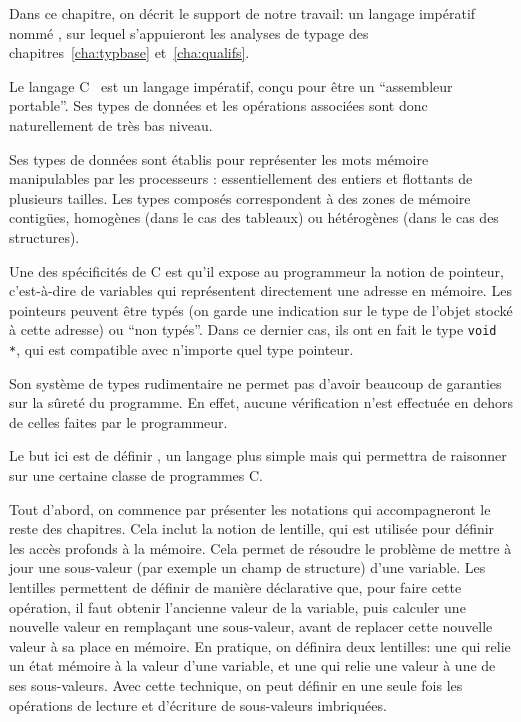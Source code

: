 Dans ce chapitre, on décrit le support de notre travail: un langage impératif
nommé \langname, sur lequel s'appuieront les analyses de typage des
chapitres~\ref{cha:typbase} et~\ref{cha:qualifs}.

Le langage C~\cite{KandR} est un langage impératif, conçu pour être un
\enquote{assembleur portable}. Ses types de données et les opérations associées
sont donc naturellement de très bas niveau.

Ses types de données sont établis pour représenter les mots mémoire manipulables
par les processeurs : essentiellement des entiers et flottants de plusieurs
tailles. Les types composés correspondent à des zones de mémoire contigües,
homogènes (dans le cas des tableaux) ou hétérogènes (dans le cas des
structures).

Une des spécificités de C est qu'il expose au programmeur la notion de pointeur,
c'est-à-dire de variables qui représentent directement une adresse en mémoire.
Les pointeurs peuvent être typés (on garde une indication sur le type de l'objet
stocké à cette adresse) ou \enquote{non typés}. Dans ce dernier cas, ils ont en
fait le type \texttt{void *}, qui est compatible avec n'importe quel type
pointeur.


Son système de types rudimentaire ne permet pas d'avoir beaucoup de garanties
sur la sûreté du programme. En effet, aucune vérification n'est effectuée en
dehors de celles faites par le programmeur.

Le but ici est de définir \langname, un langage plus simple mais qui permettra
de raisonner sur une certaine classe de programmes C.

Tout d'abord, on commence par présenter les notations qui accompagneront le
reste des chapitres. Cela inclut la notion de lentille, qui est utilisée pour
définir les accès profonds à la mémoire. Cela permet de résoudre le problème de
mettre à jour une sous-valeur (par exemple un champ de structure) d'une
variable. Les lentilles permettent de définir de manière déclarative que, pour
faire cette opération, il faut obtenir l'ancienne valeur de la variable, puis
calculer une nouvelle valeur en remplaçant une sous-valeur, avant de replacer
cette nouvelle valeur à sa place en mémoire. En pratique, on définira deux
lentilles: une qui relie un état mémoire à la valeur d'une variable, et une qui
relie une valeur à une de ses sous-valeurs. Avec cette technique, on peut
définir en une seule fois les opérations de lecture et d'écriture de
sous-valeurs imbriquées.

